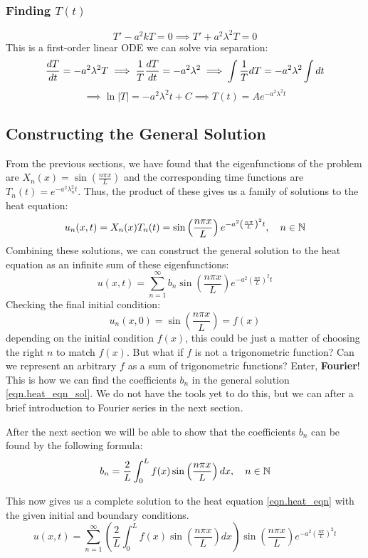 \subsubsection{Finding $T(t)$}\label{subsubsec.finding_T}
\[
T' - a^2 k T = 0
\implies T' + a^2 \lambda^2 T = 0
\]
This is a first-order linear ODE we can solve via separation:
\[
\frac{dT}{dt} = -a^2 \lambda^2 T
\implies \frac{1}{T} \frac{dT}{dt} = -a^2 \lambda^2
\implies \int \frac{1}{T} dT = -a^2 \lambda^2 \int dt
\]
\[
\implies \ln |T| = -a^2 \lambda^2 t + C
\implies T(t) = A e^{-a^2 \lambda^2 t}
\]

\subsection{Constructing the General Solution}\label{subsec.general_solution}
From the previous sections, we have found that the eigenfunctions of the problem are $X_n(x) = \sin\left(\frac{n \pi x}{L}\right)$ and the corresponding time functions are $T_n(t) = e^{-a^2 \lambda_n^2 t}$. Thus, the product of these gives us a family of solutions to the heat equation:
\[
u_n(x,t) = X_n(x) T_n(t) = \sin\left(\frac{n \pi x}{L}\right) e^{-a^2 \left(\frac{n \pi}{L}\right)^2 t}, \quad n \in \mathbb{N}
\]
Combining these solutions, we can construct the general solution to the heat equation as an infinite sum of these eigenfunctions:
\begin{equation} \label{eqn.heat_eqn_sol}
    u(x,t) = \sum_{n=1}^\infty b_n \sin\left(\frac{n \pi x}{L}\right) e^{-a^2 \left(\frac{n \pi}{L}\right)^2 t}
\end{equation}
Checking the final initial condition:
\[
u_n(x,0) = \sin\left(\frac{n \pi x}{L}\right) = f(x)
\]
depending on the initial condition $f(x)$, this could be just a matter of choosing the right $n$ to match $f(x)$. But what if $f$ is not a trigonometric function? Can we represent an arbitrary $f$ as a sum of trigonometric functions? Enter, \textbf{Fourier}! This is how we can find the coefficients $b_n$ in the general solution \eqref{eqn.heat_eqn_sol}. We do not have the tools yet to do this, but we can after a brief introduction to Fourier series in the next section.

After the next section we will be able to show that the coefficients $b_n$ can be found by the following formula:
\[
b_n = \frac{2}{L} \int_0^L f(x) \sin\left(\frac{n \pi x}{L}\right) dx, \quad n \in \mathbb{N}
\]

This now gives us a complete solution to the heat equation \eqref{eqn.heat_eqn} with the given initial and boundary conditions.
\begin{equation}\label{eqn.heat_eqn_complete_sol}
    u(x,t) = \sum_{n=1}^\infty \left( \frac{2}{L} \int_0^L f(x) \sin\left(\frac{n \pi x}{L}\right) dx \right) \sin\left(\frac{n \pi x}{L}\right) e^{-a^2 \left(\frac{n \pi}{L}\right)^2 t}
\end{equation}
